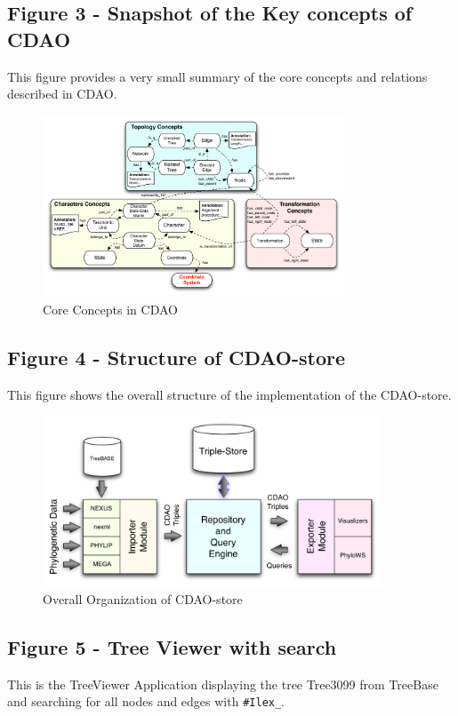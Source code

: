 \documentclass[10pt]{bmc_article}
\newenvironment{bmcformat}{\fussy\setboolean{publ}{true}}{\fussy}
\begin{document}
\begin{bmcformat}
\newpage

\subsection*{Figure 3 - Snapshot of the Key concepts of CDAO}
This figure provides a very small summary of the core concepts and relations
described in CDAO.

\begin{figure}[h]
\centerline{\includegraphics[width=0.8\textwidth]{cdao2.pdf}}
\caption{Core Concepts in CDAO}
\label{cdao2}
\end{figure}

\newpage

\subsection*{Figure 4 - Structure of CDAO-store}
This figure shows the overall structure of the implementation of the
CDAO-store.

\begin{figure}[h]
\centerline{\includegraphics[width=0.9\textwidth]{struct.pdf}}
\caption{Overall Organization of CDAO-store}
\label{struct}
\end{figure}

\newpage

  \subsection*{Figure 5 - Tree Viewer with search}
This is the TreeViewer Application displaying the tree Tree3099 from TreeBase and searching for all nodes and edges with \verb|#Ilex_|.
      

\end{bmcformat}
\end{document}
